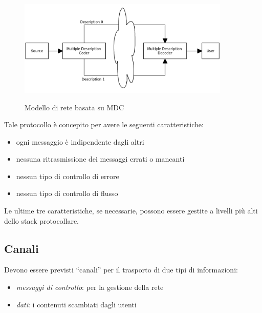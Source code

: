 \begin{figure}[hb]
\includegraphics[width=0.90\textwidth]{../images/network_mdc.png}
\label{fig:network_mdc}
\caption{Modello di rete basata su MDC}
\end{figure}

Tale protocollo è concepito per avere le seguenti caratteristiche:
\begin{itemize}
  \item ogni messaggio è indipendente dagli altri
  \item nessuna ritrasmissione dei messaggi errati o mancanti
  \item nessun tipo di controllo di errore
  \item nessun tipo di controllo di flusso 
\end{itemize}

Le ultime tre caratteristiche, se necessarie, possono essere gestite a livelli
più alti dello stack protocollare.



\subsection{Canali}
Devono essere previsti ``canali'' per il trasporto di due tipi di informazioni:
\begin{itemize}
  \item \emph{messaggi di controllo}: per la gestione della rete
  \item \emph{dati}: i contenuti scambiati dagli utenti
\end{itemize}









